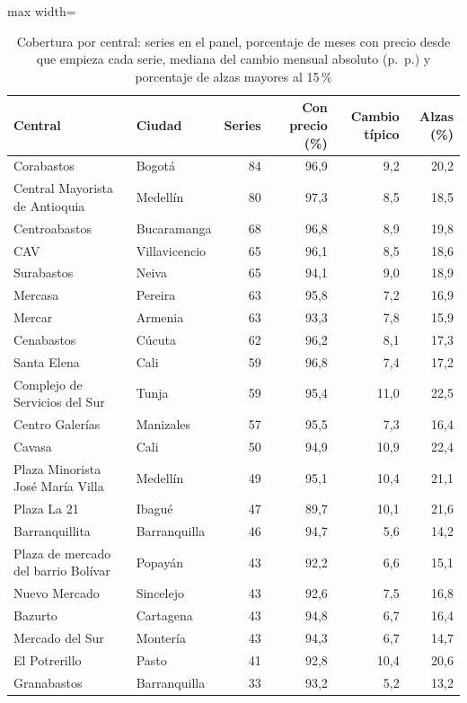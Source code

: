 \begin{table}[htbp]\centering\scriptsize
\caption{Cobertura por central: series en el panel, porcentaje de meses con precio desde que empieza cada serie, mediana del cambio mensual absoluto (p.~p.) y porcentaje de alzas mayores al 15\,\%}\label{tab:centrales}
\begin{adjustbox}{max width=\textwidth}\begin{tabular}{llrrrr}\toprule
Central & Ciudad & Series & Con precio (\%) & Cambio típico & Alzas (\%)\\ \midrule
Corabastos & Bogotá & 84 & 96{,}9 & 9{,}2 & 20{,}2 \\
Central Mayorista de Antioquia & Medellín & 80 & 97{,}3 & 8{,}5 & 18{,}5 \\
Centroabastos & Bucaramanga & 68 & 96{,}8 & 8{,}9 & 19{,}8 \\
CAV & Villavicencio & 65 & 96{,}1 & 8{,}5 & 18{,}6 \\
Surabastos & Neiva & 65 & 94{,}1 & 9{,}0 & 18{,}9 \\
Mercasa & Pereira & 63 & 95{,}8 & 7{,}2 & 16{,}9 \\
Mercar & Armenia & 63 & 93{,}3 & 7{,}8 & 15{,}9 \\
Cenabastos & Cúcuta & 62 & 96{,}2 & 8{,}1 & 17{,}3 \\
Santa Elena & Cali & 59 & 96{,}8 & 7{,}4 & 17{,}2 \\
Complejo de Servicios del Sur & Tunja & 59 & 95{,}4 & 11{,}0 & 22{,}5 \\
Centro Galerías & Manizales & 57 & 95{,}5 & 7{,}3 & 16{,}4 \\
Cavasa & Cali & 50 & 94{,}9 & 10{,}9 & 22{,}4 \\
Plaza Minorista José María Villa & Medellín & 49 & 95{,}1 & 10{,}4 & 21{,}1 \\
Plaza La 21 & Ibagué & 47 & 89{,}7 & 10{,}1 & 21{,}6 \\
Barranquillita & Barranquilla & 46 & 94{,}7 & 5{,}6 & 14{,}2 \\
Plaza de mercado del barrio Bolívar & Popayán & 43 & 92{,}2 & 6{,}6 & 15{,}1 \\
Nuevo Mercado & Sincelejo & 43 & 92{,}6 & 7{,}5 & 16{,}8 \\
Bazurto & Cartagena & 43 & 94{,}8 & 6{,}7 & 16{,}4 \\
Mercado del Sur & Montería & 43 & 94{,}3 & 6{,}7 & 14{,}7 \\
El Potrerillo & Pasto & 41 & 92{,}8 & 10{,}4 & 20{,}6 \\
Granabastos & Barranquilla & 33 & 93{,}2 & 5{,}2 & 13{,}2 \\

\end{tabular}
\end{adjustbox}
\end{table}
